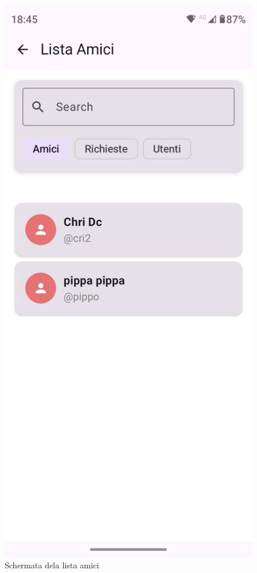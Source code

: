 \documentclass{article}
\begin{document}
\begin{figure}[H]
  \centering
  \includegraphics[width=0.6\linewidth]{friends-list.png}
  \caption{Schermata dela lista amici}
  \label{fig:sitemap}
\end{figure}
\end{document}
